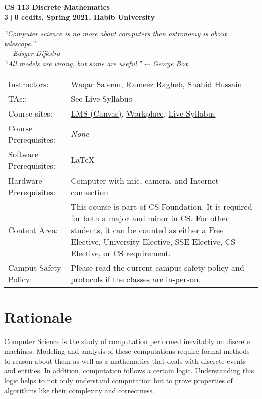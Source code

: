 \documentclass[a4paper]{article}
\begin{document}
\begin{center}
  {\bfseries {\huge CS 113 Discrete Mathematics}\\\bigskip
    {\large 3+0 cedits, Spring 2021, Habib University}}\\\medskip

\textit{``Computer science is no more about computers than astronomy is about telescope.''\\
  –- Edsger Dijkstra\\\medskip
  ``All models are wrong, but some are useful.'' -– George Box}
\end{center}
\medskip

\noindent
\begin{tabularx}{1.0\linewidth}{lX}
  Instructors:
  & \href{https://habib.edu.pk/SSE/dr-waqar-saleem/}{Waqar Saleem}, \href{https://habib.edu.pk/SSE/rameez-ragheb/}{Rameez Ragheb}, \href{https://habib.edu.pk/SSE/dr-shahid-hussain/}{Shahid Hussain}\\
  TAs:: & See Live Syllabus \\
  Course sites: & \href{https://hulms.instructure.com/courses/1262}{LMS (Canvas)}, \href{https://habibedu.workplace.com/groups/219075873051099}{Workplace}, \href{https://bit.ly/3nQPsSR}{Live Syllabus}\\
  Course Prerequisites: &  \textit{None}\\
  Software Prerequisites: &  \LaTeX\\
  Hardware Prerequisites: & Computer with mic, camera, and Internet connection\\
  Content Area: & This course is part of CS Foundation. It is required for both a major and minor in CS. For other students, it can be counted as either a Free Elective, University Elective, SSE Elective, CS Elective, or CS requirement.\\
Campus Safety Policy: & Please read the current campus safety policy and protocols if the classes are in-person.  
\end{tabularx}
\medskip

\section{Rationale}

Computer Science is the study of computation performed inevitably on discrete machines.  Modeling and analysis of these computations require formal methods to reason about them as well as a mathematics that deals with discrete events and entities.  In addition, computation follows a certain logic. Understanding this logic helps to not only understand computation but to prove properties of algorithms like their complexity and correctness.
\end{document}

